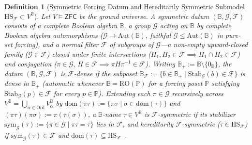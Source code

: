 \documentclass[10pt,twoside,openright]{book}
\theoremstyle{crmplain}
\theoremstyle{crmdef}
\newtheorem{definition}[theorem]{Definition}
\theoremstyle{crmremark}
\begin{document}
\begin{definition}[Symmetric Forcing Datum and Hereditarily Symmetric Submodel $\mathrm{HS}_{\mathcal{F}} \subset V^{\mathbb{B}}$]\label{def:symmetric-bv-submodel}%
%
Let $V \models \mathsf{ZFC}$ be the ground universe. A \emph{symmetric datum} $(\mathbb{B}, \mathcal{G}, \mathcal{F})$ consists of a complete Boolean algebra $\mathbb{B}$, a group $\mathcal{G}$ acting on $\mathbb{B}$ by complete Boolean algebra automorphisms ($\mathcal{G} \to \mathrm{Aut}(\mathbb{B})$, faithful $\mathcal{G} \le \mathrm{Aut}(\mathbb{B})$ in pure-set forcing), and a \emph{normal filter} $\mathcal{F}$ of subgroups of $\mathcal{G}$---a non-empty upward-closed family ($\mathcal{G} \in \mathcal{F}$) closed under finite intersections ($H_1, H_2 \in \mathcal{F} \implies H_1 \cap H_2 \in \mathcal{F}$) and conjugation ($\pi \in \mathcal{G},\, H \in \mathcal{F} \implies \pi H \pi^{-1} \in \mathcal{F}$). Writing $\mathbb{B}_+ := \mathbb{B} \setminus \{0_{\mathbb{B}}\}$, the datum $(\mathbb{B}, \mathcal{G}, \mathcal{F})$ is \emph{$\mathcal{F}$-dense} if the subposet $\mathbb{B}_{\mathcal{F}} := \{b \in \mathbb{B}_+ \mid \mathrm{Stab}_{\mathcal{G}}(b) \in \mathcal{F}\}$ is dense in $\mathbb{B}_+$ (automatic whenever $\mathbb{B} = \mathrm{RO}(\mathbb{P})$ for a forcing poset $\mathbb{P}$ satisfying $\mathrm{Stab}_{\mathcal{G}}(p) \in \mathcal{F}$ for every $p \in \mathbb{P}$). Extending each $\pi \in \mathcal{G}$ recursively across $V^{\mathbb{B}} = \bigcup_{\alpha \in \mathrm{Ord}} V^{\mathbb{B}}_\alpha$ by $\mathrm{dom}(\pi\tau) := \{\pi\sigma \mid \sigma \in \mathrm{dom}(\tau)\}$ and $(\pi\tau)(\pi\sigma) := \pi(\tau(\sigma))$, a $\mathbb{B}$-name $\tau \in V^{\mathbb{B}}$ is \emph{$\mathcal{F}$-symmetric} if its stabilizer $\mathrm{sym}_{\mathcal{G}}(\tau) := \{\pi \in \mathcal{G} \mid \pi\tau = \tau\}$ lies in $\mathcal{F}$, and \emph{hereditarily $\mathcal{F}$-symmetric} ($\tau \in \mathrm{HS}_{\mathcal{F}}$) if $\mathrm{sym}_{\mathcal{G}}(\tau) \in \mathcal{F}$ and $\mathrm{dom}(\tau) \subseteq \mathrm{HS}_{\mathcal{F}}$~\cite[\S 5.2]{Jech73}.
\end{definition}
\end{document}
